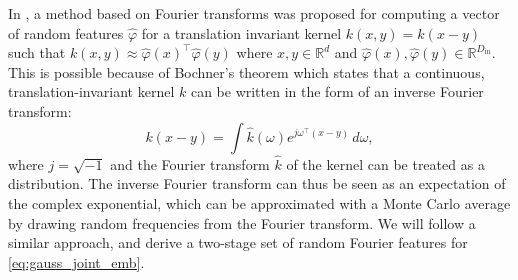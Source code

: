 \documentclass[english]{article}
\theoremstyle{plain}
\theoremstyle{plain}
\newcommand{\factor}{f}				%
\newcommand{\outV}{V}                         %
\newcommand{\approxMsg}[3]{M_{#1 \rightarrow #2}^{#3}}			%
\begin{document}


In \cite{Rahimi2007}, a method based on Fourier transforms was proposed for computing a vector
of random features $\hat{\varphi}$ for a translation invariant kernel $k(x,y) = k(x-y)$
 such that $k(x, y) \approx \hat{\varphi}(x)^\top \hat{\varphi}(y)$
where $x,y \in \mathbb{R}^d$ and $\hat{\varphi}(x), \hat{\varphi}(y) \in \mathbb{R}^{D_\mathrm{in}}$.  
This is possible because of Bochner's theorem \citep{Rudin2013} which states that a
continuous, translation-invariant kernel $k$ can be written in the form of an
inverse Fourier transform:
\begin{equation*}
k(x-y)=\int\hat{k}(\omega)e^{j\omega^{\top}\left(x-y\right)}\,
d\omega,
\end{equation*}
%
where $j=\sqrt{-1}$ and the Fourier transform $\hat{k}$ of the kernel can be
treated as a distribution. The inverse Fourier transform can thus be seen as
an expectation of the complex exponential, which can be approximated with a
Monte Carlo average by drawing random frequencies from the Fourier transform. 
We will follow a similar approach, and derive 
a two-stage set of random Fourier features for \eqref{eq:gauss_joint_emb}.
\end{document}
